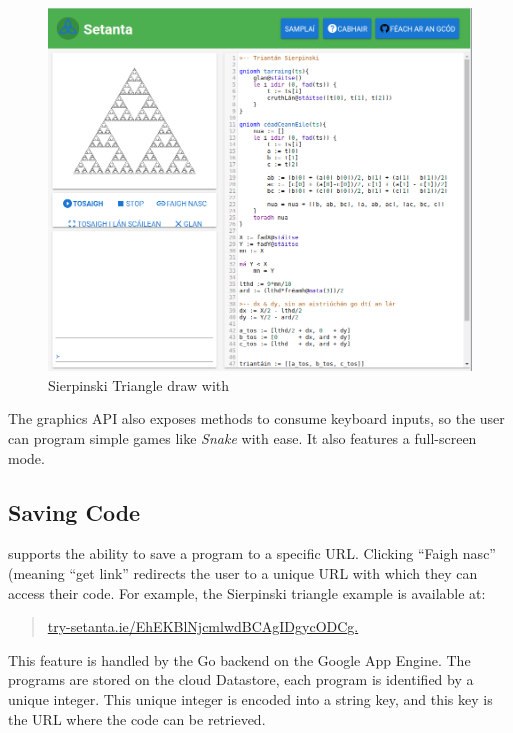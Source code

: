 \begin{figure}
    \caption{Sierpinski Triangle draw with \Setanta{}}
    \label{sierpinksitriangle}
    \begin{center}
    \includegraphics[scale=0.45]{sierpinskitriangle}
    \end{center}
\end{figure}

The graphics API also exposes methods to consume keyboard inputs, so the user can program simple games like \emph{Snake} with ease. It also features a full-screen mode.

\subsection{Saving Code}

\trys{} supports the ability to save a program to a specific URL. Clicking ``Faigh nasc'' (meaning ``get link'' redirects the user to a unique URL with which they can access their code. For example, the Sierpinski triangle example is available at:
\begin{quote}
    \href{https://try-setanta.ie/EhEKBlNjcmlwdBCAgIDgycODCg}{try-setanta.ie/EhEKBlNjcmlwdBCAgIDgycODCg.}
\end{quote}

This feature is handled by the Go backend on the Google App Engine. The programs are stored on the cloud Datastore, each program is identified by a unique integer. This unique integer is encoded into a string key, and this key is the URL where the code can be retrieved.
